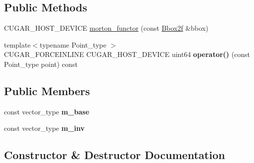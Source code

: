 \subsection*{Public Methods}
\begin{DoxyCompactItemize}
\item 
C\+U\+G\+A\+R\+\_\+\+H\+O\+S\+T\+\_\+\+D\+E\+V\+I\+CE \hyperlink{structcugar_1_1morton__functor_3_01uint64_00_012u_00_01_bbox_type_01_4_abcf88eb1daf9891daa3fd1fca59ff587}{morton\+\_\+functor} (const \hyperlink{structcugar_1_1_bbox}{Bbox2f} \&bbox)
\item 
\mbox{\label{structcugar_1_1morton__functor_3_01uint64_00_012u_00_01_bbox_type_01_4_a81f849cfac0a0b6b85bc26c146a36643}} 
{\footnotesize template$<$typename Point\+\_\+type $>$ }\\C\+U\+G\+A\+R\+\_\+\+F\+O\+R\+C\+E\+I\+N\+L\+I\+NE C\+U\+G\+A\+R\+\_\+\+H\+O\+S\+T\+\_\+\+D\+E\+V\+I\+CE uint64 {\bfseries operator()} (const Point\+\_\+type point) const
\end{DoxyCompactItemize}
\subsection*{Public Members}
\begin{DoxyCompactItemize}
\item 
\mbox{\label{structcugar_1_1morton__functor_3_01uint64_00_012u_00_01_bbox_type_01_4_a0d2abcf594355f60c387c2c438c4dc91}} 
const vector\+\_\+type {\bfseries m\+\_\+base}
\item 
\mbox{\label{structcugar_1_1morton__functor_3_01uint64_00_012u_00_01_bbox_type_01_4_a62389b938d704d0936586b769be919b6}} 
const vector\+\_\+type {\bfseries m\+\_\+inv}
\end{DoxyCompactItemize}


\subsection{Constructor \& Destructor Documentation}
\mbox{\label{structcugar_1_1morton__functor_3_01uint64_00_012u_00_01_bbox_type_01_4_abcf88eb1daf9891daa3fd1fca59ff587}} 
